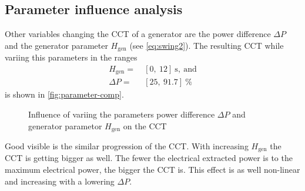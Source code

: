 




\subsection{Parameter influence analysis}

Other variables changing the \acs{CCT} of a generator are the power difference $\Delta P$ and the generator parameter $H_\mathrm{gen}$ (see \autoref{eq:swing2}). The resulting \acs{CCT} while variing this parameters in the ranges
\begin{align}
        H_\mathrm{gen}=&~[0,~12]~\mathrm{s},~\mathrm{and} \nonumber \\
        \Delta P=&~[25,~91.7]~\% \nonumber
\end{align}
is shown in \autoref{fig:parameter-comp}.

\begin{figure}[H]
        \centering
        
        \caption[Influence of parameter variation on the \acs{CCT}]{Influence of variing the parameters power difference $\Delta P$ and generator parametor $H_\mathrm{gen}$ on the \acf{CCT}}
        \label{fig:parameter-comp}
\end{figure}

Good visible is the similar progression of the \acs{CCT}. With increasing $H_\mathrm{gen}$ the \acs{CCT} is getting bigger as well. The fewer the electrical extracted power is to the maximum electrical power, the bigger the \acs{CCT} is. This effect is as well non-linear and increasing with a lowering $\Delta P$.

